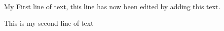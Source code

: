 \documentclass{article}
\begin{document}
My First line of text, this line has now been edited by adding this text.


This is my second line of text
\end{document}
